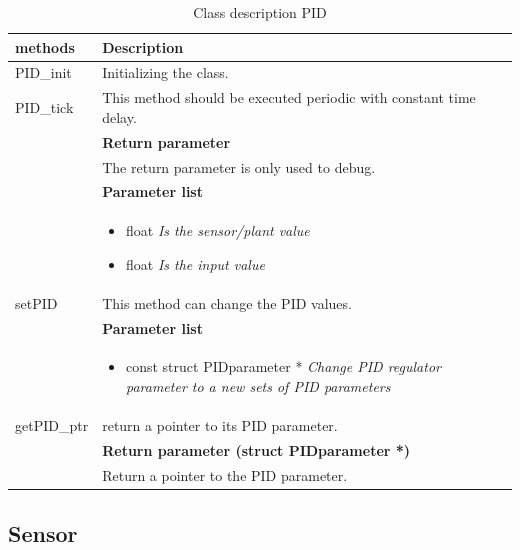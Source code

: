 \begin{table}[H]
	\centering
	\begin{tabular}{|p{5 cm}|p{10 cm}|}
		\hline
		\textbf{methods} & \textbf{Description} \\ \hline
		
		PID\_init
		& Initializing the class. 
		\\ \hline
		
		PID\_tick
		& This method should be executed periodic with constant time delay. 
		\\ & \textbf{Return parameter}
		\\ & The return parameter is only used to debug.
		\\ & \textbf{Parameter list}
		\\ & \begin{itemize}
			\item {\large float}
			\subitem \textit{Is the sensor/plant value}
			\item {\large float}
			\subitem \textit{Is the input value}
		\end{itemize}
		\\ \hline
		
		setPID
		& This method can change the PID values.
		\\ & \textbf{Parameter list}
		\\ & \begin{itemize}
			\item {\large const struct PIDparameter *}
			\subitem \textit{Change PID regulator parameter to a new sets of PID parameters}
		\end{itemize} 
		\\ \hline
		
		getPID\_ptr
		& return a pointer to its PID parameter.
		\\ & \textbf{Return parameter (struct PIDparameter *)}
		\\ & Return a pointer to the PID parameter. 
		\\ \hline
		
	\end{tabular}
	\caption{Class description PID}
	\label{table:Class_description_PID_RR_PSoC}
\end{table}

\subsection{Sensor} 

